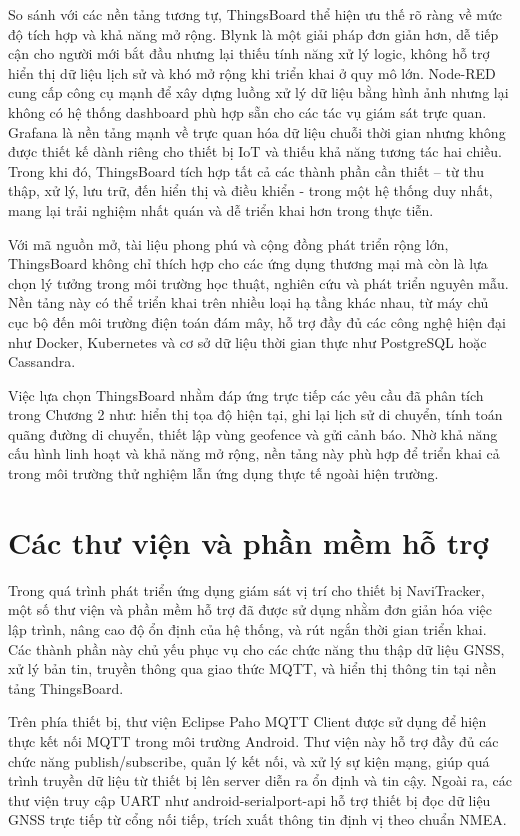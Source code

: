 \documentclass[../DoAn.tex]{subfiles}
\begin{document}
So sánh với các nền tảng tương tự, ThingsBoard thể hiện ưu thế rõ ràng về mức độ tích hợp và khả năng mở rộng. Blynk là một giải pháp đơn giản hơn, dễ tiếp cận cho người mới bắt đầu nhưng lại thiếu tính năng xử lý logic, không hỗ trợ hiển thị dữ liệu lịch sử và khó mở rộng khi triển khai ở quy mô lớn. Node-RED cung cấp công cụ mạnh để xây dựng luồng xử lý dữ liệu bằng hình ảnh nhưng lại không có hệ thống dashboard phù hợp sẵn cho các tác vụ giám sát trực quan. Grafana là nền tảng mạnh về trực quan hóa dữ liệu chuỗi thời gian nhưng không được thiết kế dành riêng cho thiết bị IoT và thiếu khả năng tương tác hai chiều. Trong khi đó, ThingsBoard tích hợp tất cả các thành phần cần thiết – từ thu thập, xử lý, lưu trữ, đến hiển thị và điều khiển - trong một hệ thống duy nhất, mang lại trải nghiệm nhất quán và dễ triển khai hơn trong thực tiễn.

Với mã nguồn mở, tài liệu phong phú và cộng đồng phát triển rộng lớn, ThingsBoard không chỉ thích hợp cho các ứng dụng thương mại mà còn là lựa chọn lý tưởng trong môi trường học thuật, nghiên cứu và phát triển nguyên mẫu. Nền tảng này có thể triển khai trên nhiều loại hạ tầng khác nhau, từ máy chủ cục bộ đến môi trường điện toán đám mây, hỗ trợ đầy đủ các công nghệ hiện đại như Docker, Kubernetes và cơ sở dữ liệu thời gian thực như PostgreSQL hoặc Cassandra.

Việc lựa chọn ThingsBoard nhằm đáp ứng trực tiếp các yêu cầu đã phân tích trong Chương 2 như: hiển thị tọa độ hiện tại, ghi lại lịch sử di chuyển, tính toán quãng đường di chuyển, thiết lập vùng geofence và gửi cảnh báo. Nhờ khả năng cấu hình linh hoạt và khả năng mở rộng, nền tảng này phù hợp để triển khai cả trong môi trường thử nghiệm lẫn ứng dụng thực tế ngoài hiện trường.
\section{Các thư viện và phần mềm hỗ trợ}
\label{section:3.5}
Trong quá trình phát triển ứng dụng giám sát vị trí cho thiết bị NaviTracker, một số thư viện và phần mềm hỗ trợ đã được sử dụng nhằm đơn giản hóa việc lập trình, nâng cao độ ổn định của hệ thống, và rút ngắn thời gian triển khai. Các thành phần này chủ yếu phục vụ cho các chức năng thu thập dữ liệu GNSS, xử lý bản tin, truyền thông qua giao thức MQTT, và hiển thị thông tin tại nền tảng ThingsBoard.

Trên phía thiết bị, thư viện Eclipse Paho MQTT Client được sử dụng để hiện thực kết nối MQTT trong môi trường Android. Thư viện này hỗ trợ đầy đủ các chức năng publish/subscribe, quản lý kết nối, và xử lý sự kiện mạng, giúp quá trình truyền dữ liệu từ thiết bị lên server diễn ra ổn định và tin cậy. Ngoài ra, các thư viện truy cập UART như android-serialport-api hỗ trợ thiết bị đọc dữ liệu GNSS trực tiếp từ cổng nối tiếp, trích xuất thông tin định vị theo chuẩn NMEA.
\end{document}
